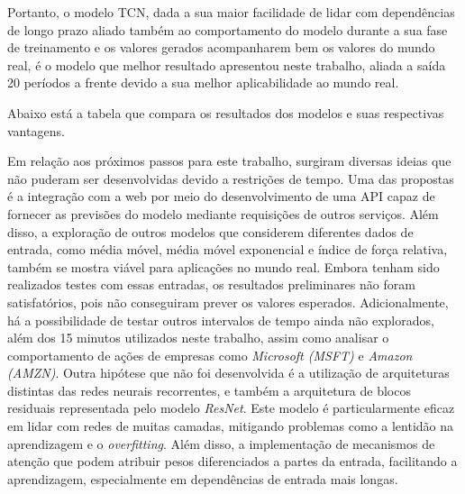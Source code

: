 Portanto, o modelo TCN, dada a sua maior facilidade de lidar com dependências de longo prazo aliado também ao comportamento do modelo durante a sua fase de treinamento e os valores gerados acompanharem bem os valores do mundo real, é o modelo que melhor resultado apresentou neste trabalho, aliada a saída 20 períodos a frente devido a sua melhor aplicabilidade ao mundo real. 

Abaixo está a tabela que compara os resultados dos modelos e suas respectivas vantagens.

Em relação aos próximos passos para este trabalho, surgiram diversas ideias que não puderam ser desenvolvidas devido a restrições de tempo. Uma das propostas é a integração com a web por meio do desenvolvimento de uma API capaz de fornecer as previsões do modelo mediante requisições de outros serviços. Além disso, a exploração de outros modelos que considerem diferentes dados de entrada, como média móvel, média móvel exponencial e índice de força relativa, também se mostra viável para aplicações no mundo real. Embora tenham sido realizados testes com essas entradas, os resultados preliminares não foram satisfatórios, pois não conseguiram prever os valores esperados. Adicionalmente, há a possibilidade de testar outros intervalos de tempo ainda não explorados, além dos 15 minutos utilizados neste trabalho, assim como analisar o comportamento de ações de empresas como \textit{Microsoft (MSFT)} e \textit{Amazon (AMZN)}. Outra hipótese que não foi desenvolvida é a utilização de arquiteturas distintas das redes neurais recorrentes, e também a arquitetura de blocos residuais representada pelo modelo \textit{ResNet}. Este modelo é particularmente eficaz em lidar com redes de muitas camadas, mitigando problemas como a lentidão na aprendizagem e o \textit{overfitting}. Além disso, a implementação de mecanismos de atenção que podem atribuir pesos diferenciados a partes da entrada, facilitando a aprendizagem, especialmente em dependências de entrada mais longas.

